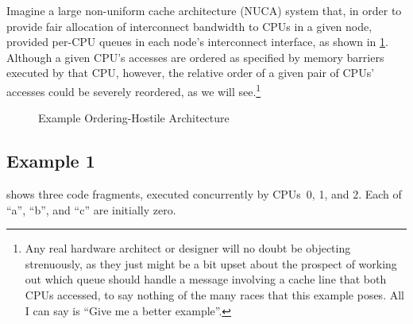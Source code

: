 \QuickQuizEnd

Imagine a large non-uniform cache architecture (NUCA) system that,
in order to provide fair allocation
of interconnect bandwidth to CPUs in a given node, provided per-CPU
queues in each node's interconnect interface, as shown in
\cref{fig:app:whymb:Example Ordering-Hostile Architecture}.
Although a given CPU's accesses are ordered as specified by memory
barriers executed by that CPU, however, the relative order of a
given pair of CPUs' accesses could be severely reordered,
as we will see.\footnote{
	Any real hardware architect or designer will no doubt be
	objecting strenuously,
	as they just might be a bit upset about the prospect of working
	out which queue should handle a message involving a cache line
	that both CPUs accessed, to say nothing of the many races that
	this example poses.
	All I can say is ``Give me a better example''.}

\begin{figure}[htb]
\centering
{}
\caption{Example Ordering-Hostile Architecture}
\label{fig:app:whymb:Example Ordering-Hostile Architecture}
\end{figure}

\subsection{Example 1}
\label{sec:app:whymb:Example 1}

shows three code fragments, executed concurrently by CPUs~0, 1, and 2.
Each of ``a'', ``b'', and ``c'' are initially zero.


